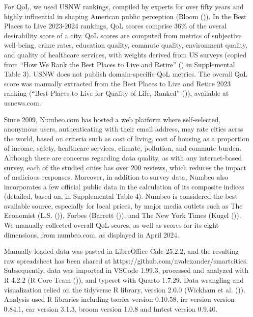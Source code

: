 \documentclass[
  english,
  12pt,
  a4paper,
]{scrartcl}
\begin{document}
For QoL, we used USNW rankings, compiled by experts for over fifty years
and highly influential in shaping American public perception (Bloom
()). In the Best Places to
Live 2023-2024 rankings, QoL scores comprise 36\% of the overal
desirability score of a city. QoL scores are computed from metrics of
subjective well-being, crime rates, education quality, commute quality,
environment quality, and quality of healthcare services, with weights
derived from US surveys (copied from {``How We Rank the {Best Places to
Live and Retire}''} () in Supplemental
Table 3). USNW does not publish domain-specific QoL metrics. The overall
QoL score was manually extracted from the Best Places to Live and Retire
2023 ranking ({``Best {Places to Live} for Quality of Life, Ranked''}
()), available at usnews.com.

Since 2009, Numbeo.com has hosted a web platform where self-selected,
anonymous users, authenticating with their email address, may rate
cities acrss the world, based on criteria such as cost of living, cost
of housing as a proportion of income, safety, healthcare services,
climate, pollution, and commute burden. Although there are concerns
regarding data quality, as with any internet-based survey, each of the
studied cities has over 200 reviews, which reduces the impact of
malicious responses. Moreover, in addition to survey data, Numbeo also
incorporates a few official public data in the calculation of its
composite indices (detailed, based on, in Supplemental Table 4). Numbeo
is considered the best available source, especially for local prices, by
major media outlets such as The Economist (L.S.
()), Forbes (Barrett
()), and The New
York Times (Kugel ()). We
manually collected overall QoL scores, as well as scores for its eight
dimensions, from numbeo.com, as displayed in April 2024.

Manually-loaded data was pasted in LibreOffice Calc 25.2.2, and the
resulting raw spreadsheet has been shared at
https://github.com/nvalexander/smartcities. Subsequently, data was
imported in VSCode 1.99.3, processed and analyzed with R 4.2.2 (R Core
Team
()), and
typeset with Quarto 1.7.29. Data wrangling and visualization relied on
the tidyverse R library, version 2.0.0 (Wickham et al.
()). Analysis used R libraries
including tseries version 0.10.58, irr version version 0.84.1, car
version 3.1.3, broom version 1.0.8 and lmtest version 0.9.40.
\end{document}
